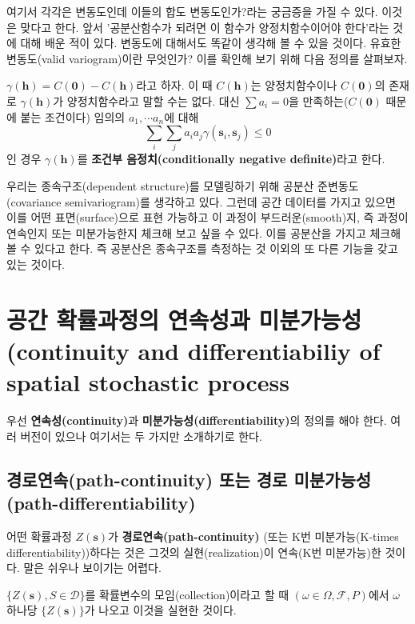 \documentclass[b5paper,]{scrbook}
\theoremstyle{plain}
\theoremstyle{definition}
\numberwithin{equation}{section}
\begin{document}
여기서 각각은 변동도인데 이들의 합도 변동도인가?라는 궁금증을 가질 수
있다. 이것은 맞다고 한다. 앞서 '공분산함수가 되려면 이 함수가
양정치함수이어야 한다'라는 것에 대해 배운 적이 있다. 변동도에 대해서도
똑같이 생각해 볼 수 있을 것이다. 유효한 변동도(valid variogram)이란
무엇인가? 이를 확인해 보기 위해 다음 정의를 살펴보자.

\(\gamma(\mathbf{h})=C(\mathbf{0})-C(\mathbf{h})\)라고 하자. 이 때
\(C(\mathbf{h})\)는 양정치함수이나 \(C(\mathbf{0})\)의 존재로
\(\gamma(\mathbf{h})\)가 양정치함수라고 말할 수는 없다. 대신
\(\sum a_{i}=0\)을 만족하는(\(C(\mathbf{0})\) 때문에 붙는 조건이다)
임의의 \(a_{1}, \cdots a_{n}\)에 대해
\[\sum_{i}\sum_{j}a_{i}a_{j}\gamma(\mathbf{s}_{i},\mathbf{s}_{j}) \leq 0\]
인 경우 \(\gamma(\mathbf{h})\)를 \textbf{조건부 음정치(conditionally
negative definite)}라고 한다.

우리는 종속구조(dependent structure)를 모델링하기 위해 공분산
준변동도(covariance semivariogram)를 생각하고 있다. 그런데 공간 데이터를
가지고 있으면 이를 어떤 표면(surface)으로 표현 가능하고 이 과정이
부드러운(smooth)지, 즉 과정이 연속인지 또는 미분가능한지 체크해 보고
싶을 수 있다. 이를 공분산을 가지고 체크해 볼 수 있다고 한다. 즉 공분산은
종속구조를 측정하는 것 이외의 또 다른 기능을 갖고 있는 것이다.

\section{공간 확률과정의 연속성과 미분가능성(continuity and
differentiabiliy of spatial stochastic
process}\label{---continuity-and-differentiabiliy-of-spatial-stochastic-process}

우선 \textbf{연속성(continuity)}과
\textbf{미분가능성(differentiability)}의 정의를 해야 한다. 여러 버전이
있으나 여기서는 두 가지만 소개하기로 한다.

\subsection{경로연속(path-continuity) 또는 경로
미분가능성(path-differentiability)}\label{path-continuity---path-differentiability}

어떤 확률과정 \(Z(\mathbf{s})\)가 \textbf{경로연속(path-continuity)}
(또는 K번 미분가능(K-times differentiability))하다는 것은 그것의
실현(realization)이 연속(K번 미분가능)한 것이다. 말은 쉬우나 보이기는
어렵다.

\(\{ Z(\mathbf{s}) , S \in \mathcal{D}\}\)를 확률변수의
모임(collection)이라고 할 때 \((\omega \in \Omega, \mathcal{F}, P)\)에서
\(\omega\) 하나당 \(\{ Z(\mathbf{s})\}\)가 나오고 이것을 실현한 것이다.
\end{document}
